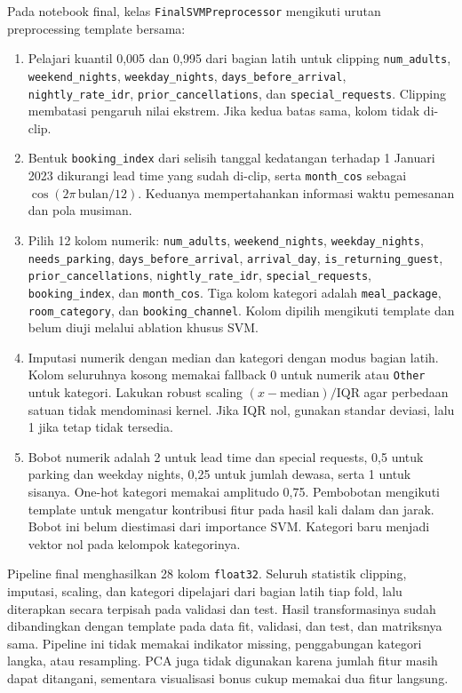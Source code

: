 Pada notebook final, kelas \texttt{FinalSVMPreprocessor} mengikuti urutan preprocessing template bersama:
\begin{enumerate}
  \item Pelajari kuantil 0,005 dan 0,995 dari bagian latih untuk clipping \texttt{num\_adults}, \texttt{weekend\_nights}, \texttt{weekday\_nights}, \texttt{days\_before\_arrival}, \texttt{nightly\_rate\_idr}, \texttt{prior\_cancellations}, dan \texttt{special\_requests}. Clipping membatasi pengaruh nilai ekstrem. Jika kedua batas sama, kolom tidak di-clip.
  \item Bentuk \texttt{booking\_index} dari selisih tanggal kedatangan terhadap 1 Januari 2023 dikurangi lead time yang sudah di-clip, serta \texttt{month\_cos} sebagai $\cos(2\pi\,\text{bulan}/12)$. Keduanya mempertahankan informasi waktu pemesanan dan pola musiman.
  \item Pilih 12 kolom numerik: \texttt{num\_adults}, \texttt{weekend\_nights}, \texttt{weekday\_nights}, \texttt{needs\_parking}, \texttt{days\_before\_arrival}, \texttt{arrival\_day}, \texttt{is\_returning\_guest}, \texttt{prior\_cancellations}, \texttt{nightly\_rate\_idr}, \texttt{special\_requests}, \texttt{booking\_index}, dan \texttt{month\_cos}. Tiga kolom kategori adalah \texttt{meal\_package}, \texttt{room\_category}, dan \texttt{booking\_channel}. Kolom dipilih mengikuti template dan belum diuji melalui ablation khusus SVM.
  \item Imputasi numerik dengan median dan kategori dengan modus bagian latih. Kolom seluruhnya kosong memakai fallback 0 untuk numerik atau \texttt{Other} untuk kategori. Lakukan robust scaling $(x-\mathrm{median})/\mathrm{IQR}$ agar perbedaan satuan tidak mendominasi kernel. Jika IQR nol, gunakan standar deviasi, lalu 1 jika tetap tidak tersedia.
  \item Bobot numerik adalah 2 untuk lead time dan special requests, 0,5 untuk parking dan weekday nights, 0,25 untuk jumlah dewasa, serta 1 untuk sisanya. One-hot kategori memakai amplitudo 0,75. Pembobotan mengikuti template untuk mengatur kontribusi fitur pada hasil kali dalam dan jarak. Bobot ini belum diestimasi dari importance SVM. Kategori baru menjadi vektor nol pada kelompok kategorinya.
\end{enumerate}
Pipeline final menghasilkan 28 kolom \texttt{float32}. Seluruh statistik clipping, imputasi, scaling, dan kategori dipelajari dari bagian latih tiap fold, lalu diterapkan secara terpisah pada validasi dan test. Hasil transformasinya sudah dibandingkan dengan template pada data fit, validasi, dan test, dan matriksnya sama. Pipeline ini tidak memakai indikator missing, penggabungan kategori langka, atau resampling. PCA juga tidak digunakan karena jumlah fitur masih dapat ditangani, sementara visualisasi bonus cukup memakai dua fitur langsung.

